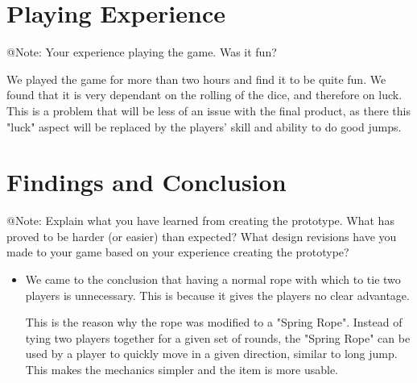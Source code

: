 \FloatBarrier



\section{Playing Experience}

\begin{TempText}
	@Note: Your experience playing the game. Was it fun?
\end{TempText}

We played the game for more than two hours and find it to be quite fun. We found that it is very dependant on the rolling of the dice, and therefore on luck. This is a problem that will be less of an issue with the final product, as there this "luck" aspect will be replaced by the players' skill and ability to do good jumps.


\section{Findings and Conclusion}

\begin{TempText}
	@Note: Explain what you have learned from creating the prototype. What has proved to be harder (or easier) than expected? What design revisions have you made to your game based on your experience creating the prototype?
\end{TempText}

\begin{itemize}
    \item We came to the conclusion that having a normal rope with which to tie two players is unnecessary. This is because it gives the players no clear advantage.

    This is the reason why the rope was modified to a "Spring Rope". Instead of tying two players together for a given set of rounds, the "Spring Rope" can be used by a player to quickly move in a given direction, similar to long jump. This makes the mechanics simpler and the item is more usable.
\end{itemize}



